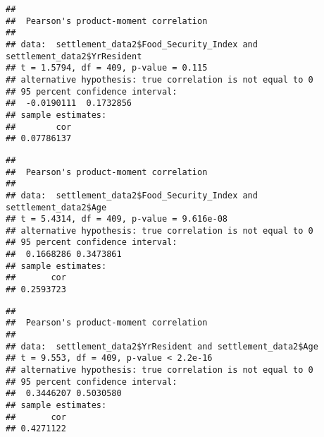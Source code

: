 \documentclass[
]{article}
\newenvironment{Shaded}{\begin{snugshade}}{\end{snugshade}}
\newcommand{\FunctionTok}[1]{\textcolor[rgb]{0.13,0.29,0.53}{\textbf{#1}}}
\newcommand{\NormalTok}[1]{#1}
\newcommand{\SpecialCharTok}[1]{\textcolor[rgb]{0.81,0.36,0.00}{\textbf{#1}}}
\begin{document}
\begin{Shaded}
\end{Shaded}

\begin{verbatim}
## 
##  Pearson's product-moment correlation
## 
## data:  settlement_data2$Food_Security_Index and settlement_data2$YrResident
## t = 1.5794, df = 409, p-value = 0.115
## alternative hypothesis: true correlation is not equal to 0
## 95 percent confidence interval:
##  -0.0190111  0.1732856
## sample estimates:
##        cor 
## 0.07786137
\end{verbatim}

\begin{Shaded}
\end{Shaded}

\begin{verbatim}
## 
##  Pearson's product-moment correlation
## 
## data:  settlement_data2$Food_Security_Index and settlement_data2$Age
## t = 5.4314, df = 409, p-value = 9.616e-08
## alternative hypothesis: true correlation is not equal to 0
## 95 percent confidence interval:
##  0.1668286 0.3473861
## sample estimates:
##       cor 
## 0.2593723
\end{verbatim}

\begin{Shaded}
\end{Shaded}

\begin{verbatim}
## 
##  Pearson's product-moment correlation
## 
## data:  settlement_data2$YrResident and settlement_data2$Age
## t = 9.553, df = 409, p-value < 2.2e-16
## alternative hypothesis: true correlation is not equal to 0
## 95 percent confidence interval:
##  0.3446207 0.5030580
## sample estimates:
##       cor 
## 0.4271122
\end{verbatim}
\end{document}
